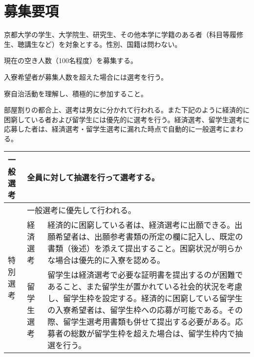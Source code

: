 \section{募集要項} \label{sec:admission}

京都大学の学生、大学院生、研究生、その他本学に学籍のある者（科目等履修生、聴講生など）を対象とする。性別、国籍は問わない。

現在の空き人数（100名程度）を募集する。

入寮希望者が募集人数を超えた場合には選考を行う。

寮自治活動を理解し、積極的に参加すること。

部屋割りの都合上、選考は男女に分かれて行われる。また下記のように経済的に困窮している者および留学生には優先的に選考を行う。経済選考、留学生選考に応募した者は、経済選考・留学生選考に漏れた時点で自動的に一般選考にまわる。 


\begin{table}[hbt]
  \begin{tabular}{|l|lp{}|}
  \hline
  一般選考 & \multicolumn{2}{l|}{全員に対して抽選を行って選考する。} \\ \hline
  \multirow{3}{*}{特別選考} & \multicolumn{2}{l|}{一般選考に優先して行われる。} \\ \cline{2-3} 
   & 経済選考 & 経済的に困窮している者は、経済選考に出願できる。出願希望者は、出願参考書類の所定の欄に記入し、既定の書類（後述）を添えて提出すること。困窮状況が明らかな場合は優先的に入寮を認める。\index{けいざいてきこんきゅう@経済的困窮}\\ \cline{2-3} 
   & 留学生選考 & 留学生は経済選考で必要な証明書を提出するのが困難であること、また留学生が置かれている社会的状況を考慮し、留学生枠を設定する。経済的に困窮している留学生の入寮希望者は、留学生枠への応募が可能である。その際、留学生選考用書類も併せて提出する必要がある。応募者の総数が留学生枠を超えた場合は、留学生枠内で抽選を行う。\\ \hline
  \end{tabular}
  \end{table}

